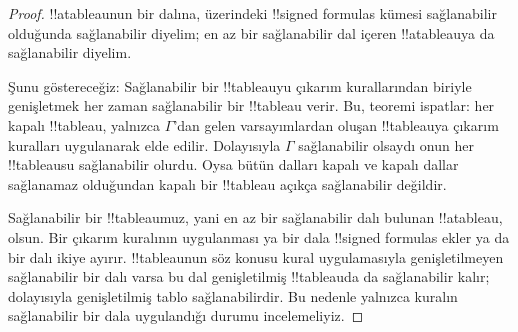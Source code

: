 \documentclass[../../../include/open-logic-section]{subfiles}
\begin{document}
\begin{proof}
!!a{tableau}{}nun bir dalına, üzerindeki !!{signed formula}s kümesi
sağlanabilir olduğunda sağlanabilir diyelim; en az bir sağlanabilir dal içeren
!!a{tableau}{}ya da sağlanabilir diyelim.

Şunu göstereceğiz: Sağlanabilir bir !!{tableau}{}yu çıkarım kurallarından
biriyle genişletmek her zaman sağlanabilir bir !!{tableau} verir. Bu, teoremi
ispatlar: her kapalı !!{tableau}, yalnızca $\Gamma$'dan gelen varsayımlardan
oluşan !!{tableau}{}ya çıkarım kuralları uygulanarak elde edilir. Dolayısıyla
$\Gamma$ sağlanabilir olsaydı onun her !!{tableau}{}su sağlanabilir olurdu.
Oysa bütün dalları kapalı ve kapalı dallar sağlanamaz olduğundan kapalı bir
!!{tableau} açıkça sağlanabilir değildir.

Sağlanabilir bir !!{tableau}{}muz, yani en az bir sağlanabilir dalı bulunan
!!a{tableau}, olsun.
Bir çıkarım kuralının uygulanması ya bir dala !!{signed formula}s ekler ya da
bir dalı ikiye ayırır. !!{tableau}{}nun söz konusu kural uygulamasıyla
genişletilmeyen sağlanabilir bir dalı varsa bu dal genişletilmiş !!{tableau}{}da
da sağlanabilir kalır; dolayısıyla genişletilmiş tablo sağlanabilirdir. Bu
nedenle yalnızca kuralın sağlanabilir bir dala uygulandığı durumu incelemeliyiz.


\end{proof}
\end{document}
